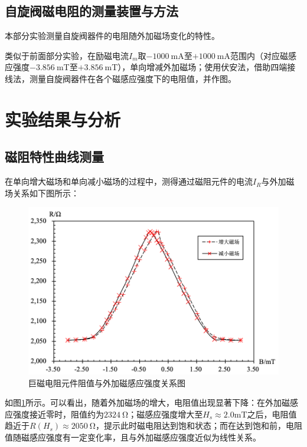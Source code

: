 \documentclass{thuemp}
\begin{document}
\subsection{自旋阀磁电阻的测量装置与方法}

本部分实验测量自旋阀器件的电阻随外加磁场变化的特性。

类似于前面部分实验，在励磁电流$I_m$取$-1000 ~ \mathrm{mA} $至$+1000~ \mathrm{mA} $范围内（对应磁感应强度$-3.856 ~ $\si{\milli\tesla}至$+3.856 ~ $\si{\milli\tesla}），单向增减外加磁场；使用伏安法，借助四端接线法，测量自旋阀器件在各个磁感应强度下的电阻值，并作图。


\section{实验结果与分析}

\subsection{磁阻特性曲线测量}

在单向增大磁场和单向减小磁场的过程中，测得通过磁阻元件的电流$I_R$与外加磁场关系如下图所示：

\begin{figure}[H]
    \centering
    \includegraphics[width=0.9\linewidth]{../Data/GMR-Plot-01-01-excel.png}
    \caption{巨磁电阻元件阻值与外加磁感应强度关系图} \label{fig:magnetoresistance}
\end{figure}

如图\ref{fig:magnetoresistance}所示。可以看出，随着外加磁场的增大，电阻值出现显著下降：在外加磁感应强度接近零时，阻值约为$2324~$\si{\ohm}；磁感应强度增大至$H_s \approx 2.0$\si{\milli\tesla}之后，电阻值趋近于$R(H_s)\approx 2050~$\si{\ohm}，提示此时磁电阻达到饱和状态；而在达到饱和前，电阻值随磁感应强度有一定变化率，且与外加磁感应强度近似为线性关系。
\end{document}
